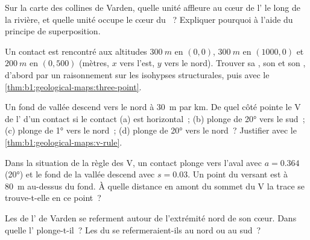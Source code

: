 \begin{exercise}[$\star$]\label{exo:b1:geological-maps:4}
Sur la carte des collines de Varden, quelle unité affleure au cœur de
l' le long de la rivière, et quelle unité occupe le cœur du
~? Expliquer pourquoi à l'aide du principe de superposition.
\end{exercise}

\begin{exercise}[$\star\star$]\label{exo:b1:geological-maps:5}
Un contact est rencontré aux altitudes $\qty{300}{m}$ en $(0, 0)$,
$\qty{300}{m}$ en $(1000, 0)$ et $\qty{200}{m}$ en $(0, 500)$ (mètres, $x$ vers
l'est, $y$ vers le nord). Trouver sa , son  et son
, d'abord par un raisonnement sur les isohypses structurales, puis avec
le \cref{thm:b1:geological-maps:three-point}.
\end{exercise}

\begin{exercise}[$\star\star$]\label{exo:b1:geological-maps:6}
Un fond de vallée descend vers le nord à \qty{30}{m} par km. De quel côté pointe
le V de l' d'un contact si le contact (a) est horizontal~; (b)
plonge de \ang{20} vers le sud~; (c) plonge de \ang{1} vers le nord~; (d) plonge
de \ang{20} vers le nord~? Justifier avec le
\cref{thm:b1:geological-maps:v-rule}.
\end{exercise}

\begin{exercise}[$\star\star$]\label{exo:b1:geological-maps:7}
Dans la situation de la règle des V, un contact plonge vers l'aval avec
$a = 0.364$ (\ang{20}) et le fond de la vallée descend avec $s = 0.03$. Un point
du versant est à \qty{80}{m} au-dessus du fond. À quelle distance en amont du
sommet du V la trace se trouve-t-elle en ce point~?
\end{exercise}

\begin{exercise}[$\star\star$]\label{exo:b1:geological-maps:8}
Les  de l' de Varden se referment autour de l'extrémité
nord de son cœur. Dans quelle  l' plonge-t-il~? Les
 du  se refermeraient-ils au nord ou au sud~?
\end{exercise}


